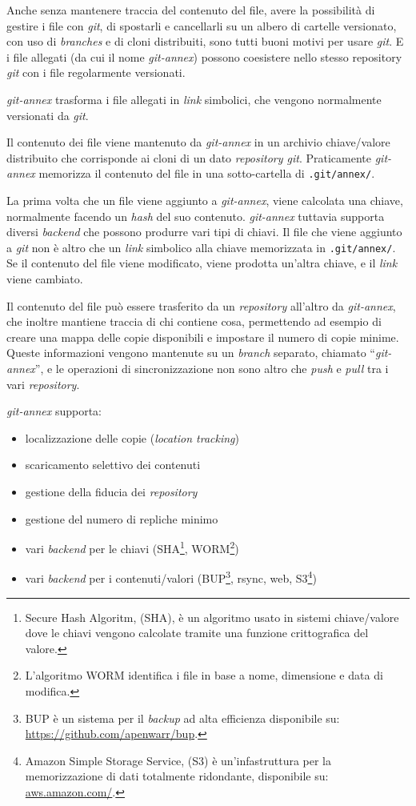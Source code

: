 Anche senza mantenere traccia del contenuto del file, avere la 
possibilità di gestire i file con \emph{git}, di spostarli e cancellarli su un
albero di cartelle versionato, con uso di \emph{branches} e di cloni
distribuiti, sono tutti buoni motivi per usare \emph{git}. E i file allegati
(da cui il nome \emph{git-annex}) possono coesistere nello stesso repository
\emph{git} con i file regolarmente versionati.

\emph{git-annex} trasforma i file allegati in \emph{link}
simbolici, che vengono normalmente versionati da \emph{git}. 

Il contenuto dei file viene mantenuto da \emph{git-annex} in un
archivio chiave/valore distribuito che corrisponde ai cloni di un
dato \emph{repository git}. Praticamente \emph{git-annex} memorizza il
contenuto del file in una sotto-cartella di \verb|.git/annex/|.

La prima volta che un file viene aggiunto a \emph{git-annex}, viene
calcolata una chiave, normalmente facendo un \emph{hash} del suo
contenuto. \emph{git-annex} tuttavia supporta diversi \emph{backend}
che possono produrre vari tipi di chiavi. Il file che viene aggiunto a
\emph{git} non è altro che un \emph{link} simbolico alla chiave
memorizzata in \verb|.git/annex/|. Se il contenuto del file viene
modificato, viene prodotta un'altra chiave, e il \emph{link} viene
cambiato.

Il contenuto del file può essere trasferito da un \emph{repository}
all'altro da \emph{git-annex}, che inoltre mantiene traccia di chi
contiene cosa, permettendo ad esempio di creare una mappa delle copie
disponibili e impostare il numero di copie minime. Queste informazioni
vengono mantenute su un \emph{branch} separato, chiamato
``\emph{git-annex}'', e le operazioni di sincronizzazione non sono
altro che \emph{push} e \emph{pull} tra i vari \emph{repository}.

\emph{git-annex} supporta:
\begin{itemize}
\item localizzazione delle copie (\emph{location tracking})
\item scaricamento selettivo dei contenuti
\item gestione della fiducia dei \emph{repository}
\item gestione del numero di repliche minimo 
\item vari \emph{backend} per le chiavi (SHA\footnote{Secure Hash
    Algoritm, (SHA), è un algoritmo usato in sistemi chiave/valore
    dove le chiavi vengono calcolate tramite una funzione
    crittografica del valore.}, WORM\footnote{L'algoritmo WORM
    identifica i file in base a nome, dimensione e data di modifica.})
\item vari \emph{backend} per i contenuti/valori (BUP\footnote{BUP è
    un sistema per il \emph{backup} ad alta efficienza disponibile su:
    \url{https://github.com/apenwarr/bup}.}, rsync, web,
  S3\footnote{Amazon Simple Storage Service, (S3) è un'infastruttura
    per la memorizzazione di dati totalmente ridondante, disponibile
    su: \url{aws.amazon.com/}.})
\end{itemize}

